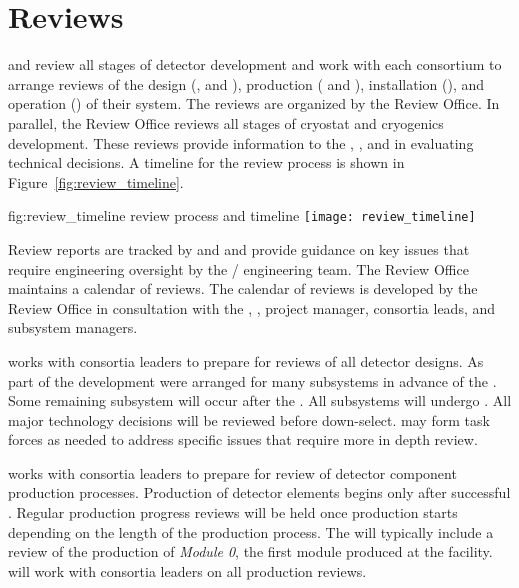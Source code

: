 \chapter{Reviews}
\label{vl:tc-review}

 and  review all stages of detector development
and work with each consortium to arrange reviews of the design
(,  and ), production (
and ), installation (), and operation
() of their system. The reviews are organized by the
 Review Office. In parallel, the Review Office reviews all
stages of  cryostat and cryogenics development.  These
reviews provide information to the , , and 
in evaluating technical decisions. A timeline for the review process
is shown in Figure~\ref{fig:review_timeline}.
\begin{dunefigure}{fig:review_timeline}
  { review process and timeline}
  \texttt{[image: review\_timeline]}
\end{dunefigure}
Review reports are tracked by  and  and provide
guidance on key issues that require engineering oversight by the
/ engineering team. The Review Office maintains a
calendar of  reviews. The calendar of reviews is developed
by the Review Office in consultation with the ,
,  project manager, consortia leads, and
 subsystem managers.

 works with consortia leaders to prepare for reviews of all detector
designs.  As part of the  development  were
arranged for many subsystems in advance of the . Some
remaining subsystem  will occur after the . All
subsystems will undergo .  All major technology decisions
will be reviewed before down-select.   may form task forces
as needed to address specific issues that require more in depth
review.


 works with consortia leaders to prepare for review of
detector component production processes.  Production of detector
elements begins only after successful . Regular production
progress reviews will be held once production starts depending on the
length of the production process. The  will typically
include a review of the production of \textit{Module 0}, the first
module produced at the facility.  will work with consortia
leaders on all production reviews.

